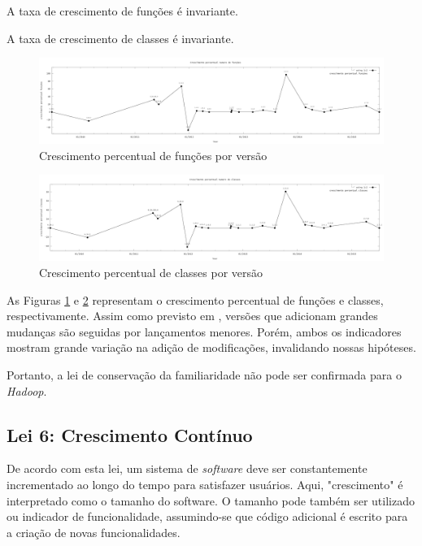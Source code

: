 \begin{hypothesis}
	A taxa de crescimento de funções é invariante.
\end{hypothesis}
\begin{hypothesis}
	A taxa de crescimento de classes é invariante.
\end{hypothesis}
\begin{figure}[h]
	\centering
	\includegraphics[width=1\linewidth]{figure/crescimento_percentual_funcoes}
	\caption{Crescimento percentual de funções por versão}
	\label{fig:crescimentopercentualfuncoes}
\end{figure}
\begin{figure}[h]
	\centering
	\includegraphics[width=1\linewidth]{figure/crescimento_percentual_classes}
	\caption{Crescimento percentual de classes por versão}
	\label{fig:crescimentopercentualclasses}
\end{figure}

As Figuras \ref{fig:crescimentopercentualfuncoes} e \ref{fig:crescimentopercentualclasses} representam o crescimento percentual de funções e classes, respectivamente. Assim como previsto em \cite{lehman1996laws}, versões que adicionam grandes mudanças são seguidas por lançamentos menores. Porém, ambos os indicadores mostram grande variação na adição de modificações, invalidando nossas hipóteses.

Portanto, a lei de conservação da familiaridade não pode ser confirmada para o \textit{Hadoop}.
\subsection{Lei 6: Crescimento Contínuo}
De acordo com esta lei, um sistema de \textit{software} deve ser constantemente incrementado ao longo do tempo para satisfazer usuários. Aqui, "crescimento" é interpretado como o tamanho do software. O tamanho pode também ser utilizado ou indicador de funcionalidade, assumindo-se que código adicional é escrito para a criação de novas funcionalidades.

